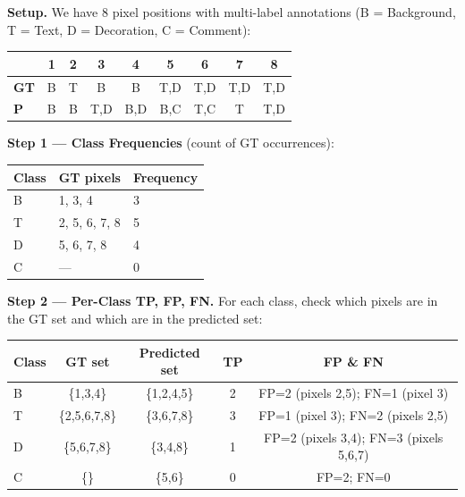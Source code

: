 \documentclass[12pt,a4paper]{article}
\begin{document}
\textbf{Setup.}  We have 8 pixel positions with multi-label annotations
(B = Background, T = Text, D = Decoration, C = Comment):

\medskip
\begin{center}
\renewcommand{\arraystretch}{1.3}
\begin{tabular}{lcccccccc}
\toprule
 & \textbf{1} & \textbf{2} & \textbf{3} & \textbf{4} & \textbf{5} & \textbf{6} & \textbf{7} & \textbf{8} \\
\midrule
\textbf{GT} & B & T  & B  & B   & T,D & T,D & T,D & T,D \\
\textbf{P}  & B & B  & T,D & B,D & B,C & T,C & T   & T,D \\
\bottomrule
\end{tabular}
\end{center}

\medskip
\textbf{Step 1 — Class Frequencies} (count of GT occurrences):

\begin{center}
\renewcommand{\arraystretch}{1.3}
\begin{tabular}{lll}
\toprule
Class & GT pixels & Frequency \\
\midrule
B & 1, 3, 4 & 3 \\
T & 2, 5, 6, 7, 8 & 5 \\
D & 5, 6, 7, 8 & 4 \\
C & — & 0 \\
\bottomrule
\end{tabular}
\end{center}

\medskip
\textbf{Step 2 — Per-Class TP, FP, FN.}
For each class, check which pixels are in the GT set and which are in the
predicted set:

\medskip
\begin{center}
\renewcommand{\arraystretch}{1.3}
\begin{tabular}{lcccc}
\toprule
Class & GT set & Predicted set & TP & FP \& FN \\
\midrule
B & \{1,3,4\}   & \{1,2,4,5\} & 2 & FP=2 (pixels 2,5); FN=1 (pixel 3) \\
T & \{2,5,6,7,8\} & \{3,6,7,8\} & 3 & FP=1 (pixel 3); FN=2 (pixels 2,5) \\
D & \{5,6,7,8\} & \{3,4,8\}   & 1 & FP=2 (pixels 3,4); FN=3 (pixels 5,6,7) \\
C & \{\}          & \{5,6\}      & 0 & FP=2; FN=0 \\
\bottomrule
\end{tabular}
\end{center}
\end{document}
